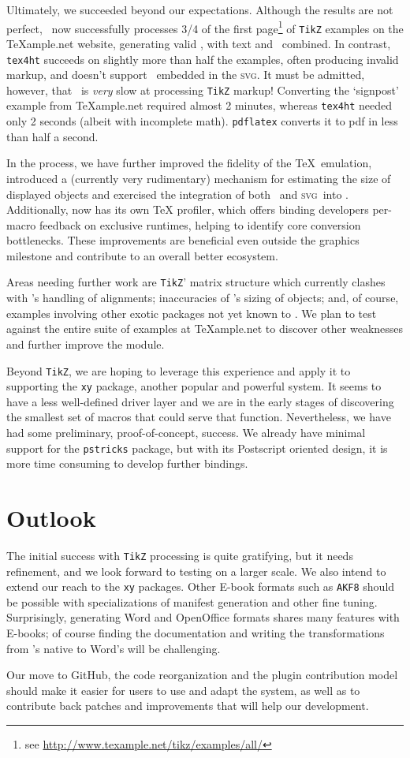 \documentclass{llncs}
\def\ebook{\mbox{E-book}\xspace}
\def\svg{\textsc{svg}\xspace}
\def\tikz{\texttt{TikZ}\xspace}
\begin{document}
Ultimately, we succeeded beyond our expectations.
Although the results are not perfect,
\LaTeXML\ now successfully processes 3/4 of the
first page\footnote{see \url{http://www.texample.net/tikz/examples/all/}} of \tikz examples on the
{\TeX}ample.net website, generating valid
, with text and \MathML\ combined.
In contrast, \texttt{tex4ht} succeeds on slightly more
than half the examples, often producing invalid markup,
and doesn't support \MathML\ embedded in the \svg.
It must be admitted, however, that \LaTeXML\ is \emph{very}
slow at processing \tikz markup!
Converting the `signpost' example from \TeX ample.net
required almost 2 minutes, whereas \texttt{tex4ht} needed
only 2 seconds (albeit with incomplete math).
\texttt{pdflatex} converts it to pdf in less than half a second.

In the process, we have further improved the
fidelity of the \TeX\ emulation, introduced
a (currently very rudimentary) mechanism for estimating
the size of displayed objects and exercised the
integration of both \MathML\ and \svg\ into \HTML. 
Additionally, {\LaTeXML} now has its own {\TeX} profiler, which
offers binding developers per-macro feedback on
exclusive runtimes, helping to identify core conversion bottlenecks.
These improvements are beneficial even outside the graphics milestone and
contribute to an overall better {\LaTeXML} ecosystem.

Areas needing further work are \tikz' matrix
structure which currently clashes with \LaTeXML's handling
of alignments; inaccuracies of \LaTeXML's sizing of objects;
and, of course, examples involving other exotic packages
not yet known to \LaTeXML.  We plan to test against
the entire suite of examples at {\TeX}ample.net to discover
other weaknesses and further improve the module.

Beyond \tikz, we are hoping to leverage this experience and apply
it to supporting the \texttt{xy} package, another
popular and powerful system.  It seems to have a less
well-defined driver layer and we are in the early stages of
discovering the smallest set of macros that could serve that
function. Nevertheless, we have had some preliminary, proof-of-concept, success.
We already have minimal support for the \texttt{pstricks}
package, but with its Postscript oriented design,
it is more time consuming to develop further bindings.

\section{Outlook}
The initial success with \tikz processing is quite
gratifying, but it needs refinement, and we look forward to testing
on a larger scale. We also intend
to extend our reach to the \texttt{xy} packages.
Other {\ebook} formats such as \texttt{AKF8} should be possible with
specializations of manifest generation and other fine tuning.
Surprisingly, generating Word and OpenOffice formats shares many features
with {\ebook}s; of course finding the documentation and writing the {\XSLT}
transformations from \LaTeXML's native {\XML} to Word's will be challenging.

Our move to GitHub, the code reorganization and the plugin contribution model should make it easier
for users to use and adapt the system, as well as to contribute
back patches and improvements that will help our development.


\end{document}
